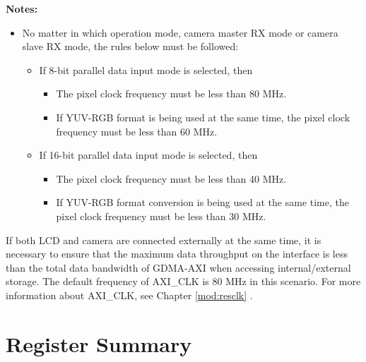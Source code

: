 \documentclass[main\_\_EN.tex]{subfiles}
\begin{document}
\textbf{Notes:}
\begin{itemize}
    \item No matter in which operation mode, camera master RX mode or camera slave RX mode, the rules below must be followed:
\begin{itemize}

    \item If 8-bit parallel data input mode is selected, then
        \begin{itemize}
        \item The pixel clock frequency must be less than 80 MHz.
        \item If YUV-RGB format is being used at the same time, the pixel clock frequency must be less than 60 MHz.
    \end{itemize}
    \item If 16-bit parallel data input mode is selected, then
        \begin{itemize}
        \item The pixel clock frequency must be less than 40 MHz.
        \item If YUV-RGB format conversion is being used at the same time, the pixel clock frequency must be less than 30 MHz.
    \end{itemize}
\end{itemize}
\end{itemize}

\begin{tiplisting}
   If both LCD and camera are connected externally at the same time, it is necessary to ensure that the maximum data throughput on the interface is less than the total data bandwidth of GDMA-AXI when accessing internal/external storage. The default frequency of AXI\_CLK is 80 MHz in this scenario. For more information about AXI\_CLK, see Chapter \ref{mod:resclk} \textit{}.
\end{tiplisting}




\newpage
\hypertarget{camlcdctrl-reg-summ}{}
\section{Register Summary}
\label{sec:camlcdctrl-reg-summ}
\end{document}
